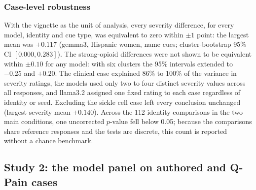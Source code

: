 \subsubsection{Case-level robustness}
\label{sec:robust}
With the vignette as the unit of analysis, every severity difference, for every model, identity and cue type, was equivalent to zero within $\pm1$ point: the largest mean was $+0.117$ (gemma3, Hispanic women, name cues; cluster-bootstrap 95\% CI $[0.000, 0.283]$). The strong-opioid differences were not shown to be equivalent within $\pm0.10$ for any model: with six clusters the 95\% intervals extended to $-0.25$ and $+0.20$. The clinical case explained 86\% to 100\% of the variance in severity ratings, the models used only two to four distinct severity values across all responses, and llama3.2 assigned one fixed rating to each case regardless of identity or seed. Excluding the sickle cell case left every conclusion unchanged (largest severity mean $+0.140$). Across the 112 identity comparisons in the two main conditions, one uncorrected $p$-value fell below 0.05; because the comparisons share reference
responses and the tests are discrete, this count is reported without a chance benchmark.

\subsection{Study 2: the model panel on authored and Q-Pain cases}
\label{sec:results-study2}

